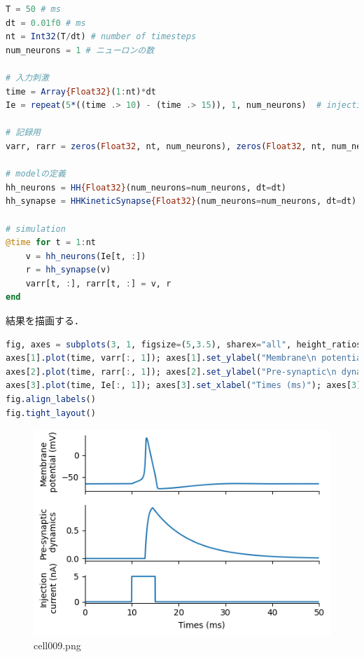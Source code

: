 \begin{lstlisting}[language=julia]
T = 50 # ms
dt = 0.01f0 # ms
nt = Int32(T/dt) # number of timesteps
num_neurons = 1 # ニューロンの数

# 入力刺激
time = Array{Float32}(1:nt)*dt
Ie = repeat(5*((time .> 10) - (time .> 15)), 1, num_neurons)  # injection current

# 記録用
varr, rarr = zeros(Float32, nt, num_neurons), zeros(Float32, nt, num_neurons)

# modelの定義
hh_neurons = HH{Float32}(num_neurons=num_neurons, dt=dt)
hh_synapse = HHKineticSynapse{Float32}(num_neurons=num_neurons, dt=dt)

# simulation
@time for t = 1:nt
    v = hh_neurons(Ie[t, :])
    r = hh_synapse(v)
    varr[t, :], rarr[t, :] = v, r
end
\end{lstlisting}
結果を描画する．
\begin{lstlisting}[language=julia]
fig, axes = subplots(3, 1, figsize=(5,3.5), sharex="all", height_ratios=[2, 2, 1])
axes[1].plot(time, varr[:, 1]); axes[1].set_ylabel("Membrane\n potential (mV)"); axes[1].set_xlim(0, 50)
axes[2].plot(time, rarr[:, 1]); axes[2].set_ylabel("Pre-synaptic\n dynamics")
axes[3].plot(time, Ie[:, 1]); axes[3].set_xlabel("Times (ms)"); axes[3].set_ylabel("Injection\n current (nA)")
fig.align_labels()
fig.tight_layout()
\end{lstlisting}
\begin{figure}[ht]
	\centering
	\includegraphics[scale=0.8, max width=\linewidth]{./fig/synapse-model/kinetic-synapse/cell009.png}
	\caption{cell009.png}
	\label{cell009.png}
\end{figure}
